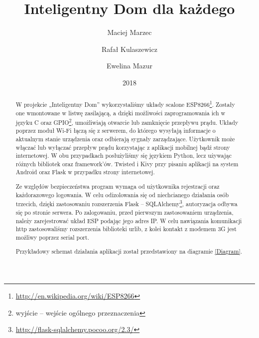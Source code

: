 \documentclass{xmgr}
\author   {Maciej Marzec}
\author   {Rafał Kulaszewicz}
\author   {Ewelina Mazur}
\title    {Inteligentny Dom dla każdego}
\date     {2018}
\begin{document}
\begin{abstract}
W projekcie „Inteligentny Dom” wykorzystaliśmy układy scalone ESP8266\footnote{\url{http://en.wikipedia.org/wiki/ESP8266}}. Zostały one wmontowane w listwę zasilającą, a dzięki możliwości zaprogramowania ich w języku C oraz GPIO\footnote{wyjście -- wejście ogólnego przeznaczenia}, umożliwiają otwarcie lub zamknięcie przepływu prądu. Układy poprzez moduł Wi-Fi łączą się z serwerem, do którego wysyłają informacje o aktualnym stanie urządzenia oraz odbierają sygnały zarządzające. Użytkownik może włączać lub wyłączać przepływ prądu korzystając z aplikacji mobilnej bądź strony internetowej. W obu przypadkach posłużyliśmy się językiem Python, lecz używając różnych bibliotek oraz framework’ów. Twisted i Kivy przy pisaniu aplikacji na system Android oraz Flask w przypadku strony internetowej. 

Ze względów bezpieczeństwa program wymaga od użytkownika rejestracji oraz każdorazowego logowania. W celu odizolowania się od niechcianego działania osób trzecich, dzięki zastosowaniu rozszerzenia Flask -- SQLAlchemy\footnote{\url{http://flask-sqlalchemy.pocoo.org/2.3/}}, autoryzacja odbywa się po stronie serwera. Po zalogowaniu, przed pierwszym zastosowaniem urządzenia, należy zarejestrować układ ESP podając jego adres IP. W celu nawiązania komunikacji http zastosowaliśmy rozszerzenia biblioteki urlib, z kolei kontakt z modemem 3G jest możliwy poprzez serial port. 

Przykładowy schemat działania aplikacji został przedstawiony na diagramie \ref{Diagram}.


\end{abstract}


\maketitle
\end{document}
